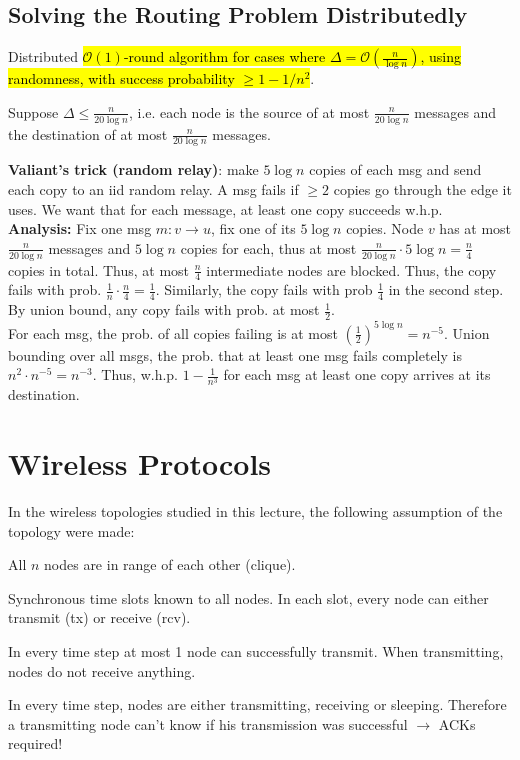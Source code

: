 \documentclass[a4paper, 8pt, landscape]{scrartcl}
\begin{document}
\begin{multicols*}{3}
\subsection{Solving the Routing Problem Distributedly}

Distributed \hl{$\mathcal{O}(1)$-round algorithm for cases where $\Delta = \mathcal{O}(\frac{n}{\log n})$, using randomness, with success probability $\geq 1 - 1/n^2$}.

Suppose $\Delta \leq \frac{n}{20\log n}$, i.e. each node is the source of at most $\frac{n}{20\log n}$ messages and the destination of at most $\frac{n}{20\log n}$ messages.

\textbf{Valiant's trick (random relay)}: make $5\log n$ copies of each msg and send each copy to an iid random relay. A msg fails if $\geq 2$ copies go through the edge it uses. We want that for each message, at least one copy succeeds w.h.p.\\

\textbf{Analysis:} 	Fix one msg $m: v \rightarrow u$, fix one of its $5\log n$ copies. Node $v$ has at most $\frac{n}{20\log n}$ messages and $5\log n$ copies for each, thus at most $\frac{n}{20\log n} \cdot 5\log n = \frac{n}{4}$ copies in total. Thus, at most $\frac{n}{4}$ intermediate nodes are blocked. Thus, the copy fails with prob. $\frac{1}{n} \cdot \frac{n}{4} = \frac{1}{4}$. Similarly, the copy fails with prob $\frac{1}{4}$ in the second step. By union bound, any copy fails with prob. at most $\frac{1}{2}$.\\
For each msg, the prob. of all copies failing is at most $(\frac{1}{2})^{5\log n} = n^{-5}$. Union bounding over all msgs, the prob. that at least one msg fails completely is $n^2 \cdot n^{-5} = n^{-3}$. Thus, w.h.p. $1 - \frac{1}{n^{3}}$ for each msg at least one copy arrives at its destination.

\section{Wireless Protocols}

In the wireless topologies studied in this lecture, the following assumption of the topology were made:

\begin{compactitem}
\item All $n$ nodes are in range of each other (clique).
\item Synchronous time slots known to all nodes. In each slot, every node can either transmit (tx) or receive (rcv).
\item In every time step at most 1 node can successfully transmit. When transmitting, nodes do not receive anything.
\item In every time step, nodes are either transmitting, receiving or sleeping. Therefore a transmitting node can’t know if his transmission was successful $\rightarrow$ ACKs required!
\end{compactitem}


\end{multicols*}
\end{document}
